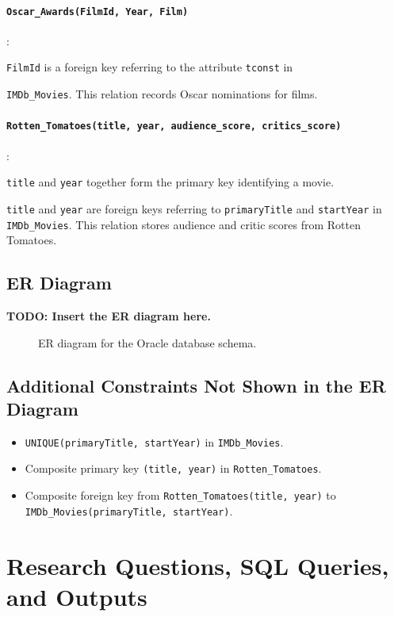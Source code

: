 \documentclass[12pt]{article}
\begin{document}
\paragraph{\texttt{Oscar\_Awards(FilmId, Year, Film)}}:

\texttt{FilmId} is a foreign key referring to the attribute \texttt{tconst} in 

\texttt{IMDb\_Movies}. This relation records Oscar nominations for films.

\paragraph{\texttt{Rotten\_Tomatoes(title, year, audience\_score, critics\_score)}}:

\texttt{title} and \texttt{year} together form the primary key identifying a movie. 

\texttt{title} and \texttt{year} are foreign keys referring to \texttt{primaryTitle} and \texttt{startYear} in \texttt{IMDb\_Movies}. This relation stores audience and critic scores from Rotten Tomatoes.

\subsection{ER Diagram}
\textbf{TODO: Insert the ER diagram here.}

\begin{figure}[H]
    \centering
    \caption{ER diagram for the Oracle database schema.}
\end{figure}

\subsection{Additional Constraints Not Shown in the ER Diagram}
\begin{itemize}[leftmargin=1.5em]
    \item \texttt{UNIQUE(primaryTitle, startYear)} in \texttt{IMDb\_Movies}.
    \item Composite primary key \texttt{(title, year)} in \texttt{Rotten\_Tomatoes}.
    \item Composite foreign key from \texttt{Rotten\_Tomatoes(title, year)} to \texttt{IMDb\_Movies(primaryTitle, startYear)}.
\end{itemize}

\section{Research Questions, SQL Queries, and Outputs}
\end{document}
